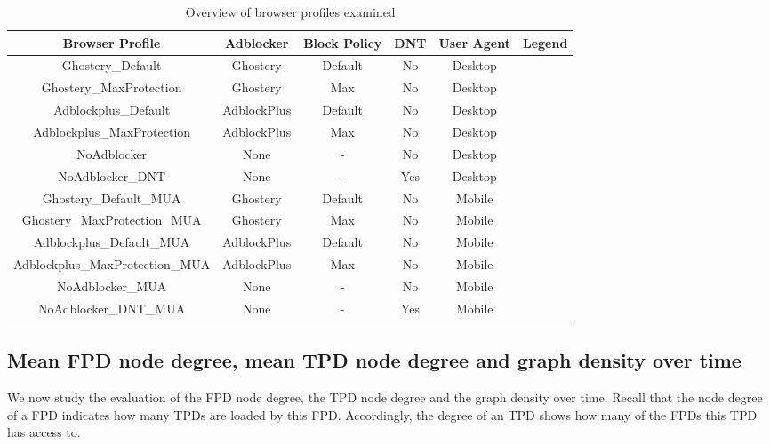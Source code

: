   \begin{table}
  \small
  \begin{adjustbox}{center}
  \begin{tabular}{|c|c c c c c|}
  \hline
  Browser Profile & Adblocker & Block Policy & DNT & User Agent & Legend \\
  \hline
  Ghostery\_Default & Ghostery & Default & No & Desktop  & {\color{red}\solidthinrule} \\
  Ghostery\_MaxProtection & Ghostery & Max & No & Desktop & {\color{red}\solidthickrule} \\
  Adblockplus\_Default & AdblockPlus & Default & No & Desktop & {\color{blue}\solidthinrule} \\
  Adblockplus\_MaxProtection & AdblockPlus & Max & No & Desktop & {\color{blue}\solidthickrule} \\
  NoAdblocker & None & - & No & Desktop & {\color{darkgreen}\solidthinrule} \\
  NoAdblocker\_DNT & None & - & Yes & Desktop & {\color{darkgreen}\solidthickrule} \\
  Ghostery\_Default\_MUA & Ghostery & Default & No & Mobile & {\color{red}\dashedthinrule} \\
  Ghostery\_MaxProtection\_MUA & Ghostery & Max & No & Mobile & {\color{red}\dashedthickrule} \\
  Adblockplus\_Default\_MUA & AdblockPlus & Default & No & Mobile & {\color{blue}\dashedthinrule} \\
  Adblockplus\_MaxProtection\_MUA & AdblockPlus & Max & No & Mobile & {\color{blue}\dashedthickrule} \\
  NoAdblocker\_MUA & None & - & No & Mobile & {\color{darkgreen}\dashedthinrule} \\
  NoAdblocker\_DNT\_MUA & None & - & Yes & Mobile & {\color{darkgreen}\dashedthickrule} \\
  \hline
  
  \end{tabular}
  \end{adjustbox}
  \caption{Overview of browser profiles examined}
  \label{table:browser_profiles}
  \end{table}
  


\subsection{Mean FPD node degree, mean TPD node degree and graph density over time}
\label{sec:metrics_without_entities}
We now study the evaluation of the FPD node degree, the TPD node degree and the graph density over time. Recall that the node degree of a FPD indicates how many TPDs are loaded by this FPD. Accordingly, the degree of an TPD shows how many of the FPDs this TPD has access to.

